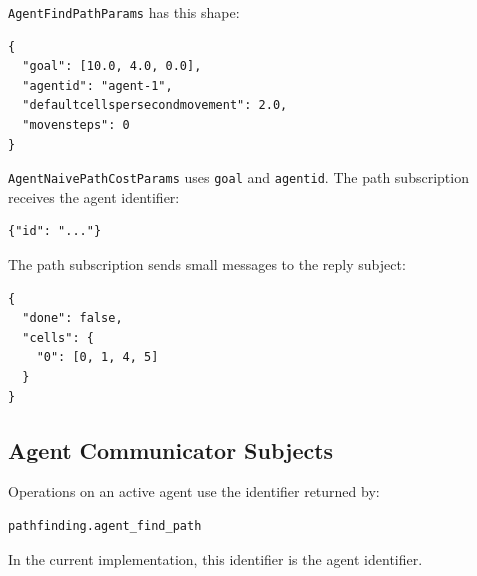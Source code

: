 \documentclass[12pt,a4paper]{report}
\begin{document}
\texttt{AgentFindPathParams} has this shape:

\begin{lstlisting}
{
  "goal": [10.0, 4.0, 0.0],
  "agentid": "agent-1",
  "defaultcellspersecondmovement": 2.0,
  "movensteps": 0
}
\end{lstlisting}

\texttt{AgentNaivePathCostParams} uses \texttt{goal} and \texttt{agentid}. The
path subscription receives the agent identifier:

\begin{lstlisting}
{"id": "..."}
\end{lstlisting}

The path subscription sends small messages to the reply subject:

\begin{lstlisting}
{
  "done": false,
  "cells": {
    "0": [0, 1, 4, 5]
  }
}
\end{lstlisting}

\subsection{Agent Communicator Subjects}

Operations on an active agent use the identifier returned by:

\begin{lstlisting}
pathfinding.agent_find_path
\end{lstlisting}

In the current implementation, this identifier is the agent identifier.
\end{document}
